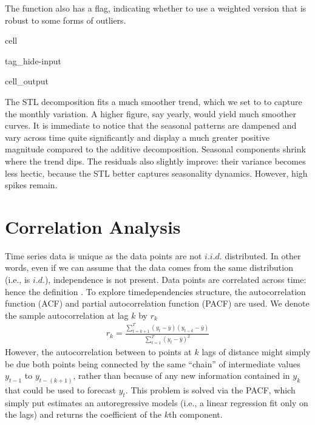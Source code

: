 \documentclass[letterpaper,10pt,english]{jupyterBook}
\begin{document}
\sphinxAtStartPar
The function also has a  flag, indicating whether to use a weighted version that is robust to some forms of outliers.

\begin{sphinxuseclass}{cell}
\begin{sphinxuseclass}{tag_hide-input}
\begin{sphinxuseclass}{cell_output}
\noindent{}

\end{sphinxuseclass}
\end{sphinxuseclass}
\end{sphinxuseclass}
\sphinxAtStartPar
The STL decomposition fits a much smoother trend, which we set to  to capture the monthly variation. A higher figure, say yearly, would yield much smoother curves. It is immediate to notice that the seasonal patterns are dampened and vary across time quite significantly and display a much greater positive magnitude compared to the additive decomposition. Seasonal components shrink where the trend dips. The residuals also slightly improve: their variance becomes less hectic, because the STL better captures seasonality dynamics. However, high spikes remain.


\section{Correlation Analysis}
\label{\detokenize{05-time_series_analysis:correlation-analysis}}
\sphinxAtStartPar
Time series data is unique as the data points are not \(i.i.d.\) distributed. In other words, even if we can assume that the data comes from the same distribution (i.e., is \(i.d.\)), independence is not present. Data points are correlated across time: hence the definition . To explore time\sphinxhyphen{}dependencies structure, the auto\sphinxhyphen{}correlation function (ACF) and partial auto\sphinxhyphen{}correlation function (PACF) are used. We denote the sample autocorrelation at lag \(k\) by \(r_k\)
\begin{equation*}
\begin{split}r_k = \frac{\sum_{t=k+1}^T (y_t-\bar{y})(y_{t-k}-\bar{y})}{\sum_{t=1}^T (y_t-\bar{y})^2}\end{split}
\end{equation*}
\sphinxAtStartPar
However, the autocorrelation between to points at \(k\) lags of distance might simply be due both points being connected by the same “chain” of intermediate values \(y_{t-1}\) to \(y_{t-(k+1)}\), rather than because of any new information contained in  \(y_k\)  that could be used to forecast \(y_t\). This problem is solved via the PACF, which \sphinxhyphen{} simply put \sphinxhyphen{} estimates an autoregressive models (i.e., a linear regression fit only on the lags) and returns the coefficient of the \(k\)th component.
\end{document}
